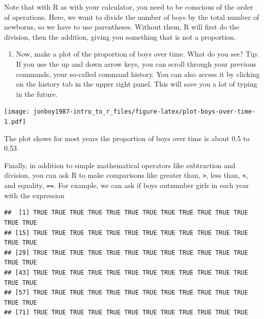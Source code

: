 \documentclass[]{article}
\newenvironment{Shaded}{\begin{snugshade}}{\end{snugshade}}
\newcommand{\KeywordTok}[1]{\textcolor[rgb]{0.13,0.29,0.53}{\textbf{#1}}}
\newcommand{\StringTok}[1]{\textcolor[rgb]{0.31,0.60,0.02}{#1}}
\newcommand{\OperatorTok}[1]{\textcolor[rgb]{0.81,0.36,0.00}{\textbf{#1}}}
\newcommand{\NormalTok}[1]{#1}
\providecommand{\tightlist}{%
  \setlength{\itemsep}{0pt}\setlength{\parskip}{0pt}}
\begin{document}
Note that with R as with your calculator, you need to be conscious of
the order of operations. Here, we want to divide the number of boys by
the total number of newborns, so we have to use parentheses. Without
them, R will first do the division, then the addition, giving you
something that is not a proportion.

\begin{enumerate}
\def\labelenumi{\arabic{enumi}.}
\setcounter{enumi}{2}
\tightlist
\item
  Now, make a plot of the proportion of boys over time. What do you see?
  Tip: If you use the up and down arrow keys, you can scroll through
  your previous commands, your so-called command history. You can also
  access it by clicking on the history tab in the upper right panel.
  This will save you a lot of typing in the future.
\end{enumerate}

\begin{Shaded}
\end{Shaded}

\texttt{[image: jonboy1987-intro\_to\_r\_files/figure-latex/plot-boys-over-time-1.pdf]}

The plot shows for most years the proportion of boys over time is about
0.5 to 0.53

Finally, in addition to simple mathematical operators like subtraction
and division, you can ask R to make comparisons like greater than,
\texttt{\textgreater{}}, less than, \texttt{\textless{}}, and equality,
\texttt{==}. For example, we can ask if boys outnumber girls in each
year with the expression

\begin{Shaded}
\end{Shaded}

\begin{verbatim}
##  [1] TRUE TRUE TRUE TRUE TRUE TRUE TRUE TRUE TRUE TRUE TRUE TRUE TRUE TRUE
## [15] TRUE TRUE TRUE TRUE TRUE TRUE TRUE TRUE TRUE TRUE TRUE TRUE TRUE TRUE
## [29] TRUE TRUE TRUE TRUE TRUE TRUE TRUE TRUE TRUE TRUE TRUE TRUE TRUE TRUE
## [43] TRUE TRUE TRUE TRUE TRUE TRUE TRUE TRUE TRUE TRUE TRUE TRUE TRUE TRUE
## [57] TRUE TRUE TRUE TRUE TRUE TRUE TRUE TRUE TRUE TRUE TRUE TRUE TRUE TRUE
## [71] TRUE TRUE TRUE TRUE TRUE TRUE TRUE TRUE TRUE TRUE TRUE TRUE
\end{verbatim}
\end{document}

